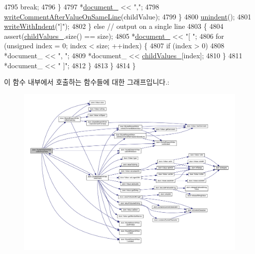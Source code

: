 \begin{DoxyCode}
4795           \textcolor{keywordflow}{break};
4796         \}
4797         *\hyperlink{class_json_1_1_styled_stream_writer_aa8c4e4576f5c3dcb10955d133a092dd6}{document\_} << \textcolor{stringliteral}{","};
4798         \hyperlink{class_json_1_1_styled_stream_writer_ad2ca860e317ca91d6b2932535b4ce9c7}{writeCommentAfterValueOnSameLine}(childValue);
4799       \}
4800       \hyperlink{class_json_1_1_styled_stream_writer_a74d8fb9beecd29759d7b79f430386358}{unindent}();
4801       \hyperlink{class_json_1_1_styled_stream_writer_a4e64789373b359c9b7a7244509b918fc}{writeWithIndent}(\textcolor{stringliteral}{"]"});
4802     \} \textcolor{keywordflow}{else} \textcolor{comment}{// output on a single line}
4803     \{
4804       assert(\hyperlink{class_json_1_1_styled_stream_writer_aafd62e00a401df73fcacb2e410114b3d}{childValues\_}.size() == size);
4805       *\hyperlink{class_json_1_1_styled_stream_writer_aa8c4e4576f5c3dcb10955d133a092dd6}{document\_} << \textcolor{stringliteral}{"[ "};
4806       \textcolor{keywordflow}{for} (\textcolor{keywordtype}{unsigned} index = 0; index < size; ++index) \{
4807         \textcolor{keywordflow}{if} (index > 0)
4808           *document\_ << \textcolor{stringliteral}{", "};
4809         *document\_ << \hyperlink{class_json_1_1_styled_stream_writer_aafd62e00a401df73fcacb2e410114b3d}{childValues\_}[index];
4810       \}
4811       *document\_ << \textcolor{stringliteral}{" ]"};
4812     \}
4813   \}
4814 \}
\end{DoxyCode}
이 함수 내부에서 호출하는 함수들에 대한 그래프입니다.\+:
\nopagebreak
\begin{figure}[H]
\begin{center}
\leavevmode
\includegraphics[width=350pt]{class_json_1_1_styled_stream_writer_a606f2ddd58093c9b019d452c1b6f09fe_cgraph}
\end{center}
\end{figure}
